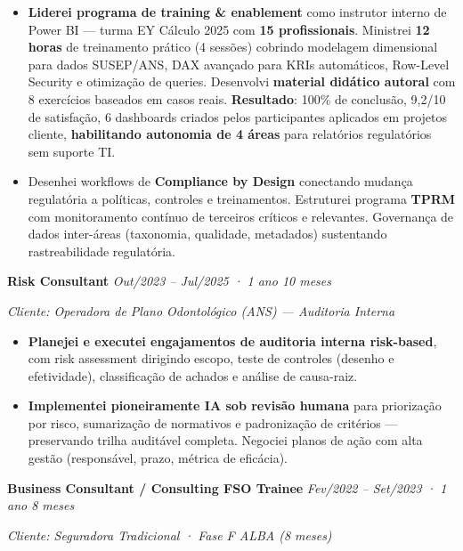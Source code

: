 \documentclass[10pt, a4paper]{article}
\newcommand{\roletitle}[2]{%
  \vspace{0.4em}%
  {\sffamily\fontsize{10pt}{12pt}\selectfont\bfseries\color{GraphiteGrey}#1}%
  \hfill%
  {\sffamily\fontsize{9pt}{11pt}\selectfont\itshape\color{GraphiteGrey}#2}%
  \vspace{0.2em}%
}
\newcommand{\clientcontext}[1]{%
  {\sffamily\fontsize{9pt}{11pt}\selectfont\itshape\color{GraphiteGrey}#1}%
  \vspace{0.3em}%
}
\newcommand{\achievement}[1]{%
  \item[\textcolor{ExecutiveNavy}{\textbf{•}}] \RaggedRight #1%
}
\begin{document}
\begin{itemize}[leftmargin=1.2em, itemsep=0.3em, parsep=0pt, topsep=0.3em]
\achievement{\textbf{Liderei programa de training \& enablement} como instrutor interno de Power BI — turma EY Cálculo 2025 com \textbf{15 profissionais}. Ministrei \textbf{12 horas} de treinamento prático (4 sessões) cobrindo modelagem dimensional para dados SUSEP/ANS, DAX avançado para KRIs automáticos, Row-Level Security e otimização de queries. Desenvolvi \textbf{material didático autoral} com 8 exercícios baseados em casos reais. \textbf{Resultado}: 100\% de conclusão, 9,2/10 de satisfação, 6 dashboards criados pelos participantes aplicados em projetos cliente, \textbf{habilitando autonomia de 4 áreas} para relatórios regulatórios sem suporte TI.}

\achievement{Desenhei workflows de \textbf{Compliance by Design} conectando mudança regulatória a políticas, controles e treinamentos. Estruturei programa \textbf{TPRM} com monitoramento contínuo de terceiros críticos e relevantes. Governança de dados inter-áreas (taxonomia, qualidade, metadados) sustentando rastreabilidade regulatória.}

\end{itemize}

\vspace{0.5em}

\roletitle{Risk Consultant}{Out/2023 – Jul/2025 · 1 ano 10 meses}
\clientcontext{Cliente: Operadora de Plano Odontológico (ANS) — Auditoria Interna}

\begin{itemize}[leftmargin=1.2em, itemsep=0.3em, parsep=0pt, topsep=0.3em]

\achievement{\textbf{Planejei e executei engajamentos de auditoria interna risk-based}, com risk assessment dirigindo escopo, teste de controles (desenho e efetividade), classificação de achados e análise de causa-raiz.}

\achievement{\textbf{Implementei pioneiramente IA sob revisão humana} para priorização por risco, sumarização de normativos e padronização de critérios — preservando trilha auditável completa. Negociei planos de ação com alta gestão (responsável, prazo, métrica de eficácia).}

\end{itemize}

\vspace{0.5em}

\roletitle{Business Consultant / Consulting FSO Trainee}{Fev/2022 – Set/2023 · 1 ano 8 meses}
\clientcontext{Cliente: Seguradora Tradicional · Fase F ALBA (8 meses)}
\end{document}
